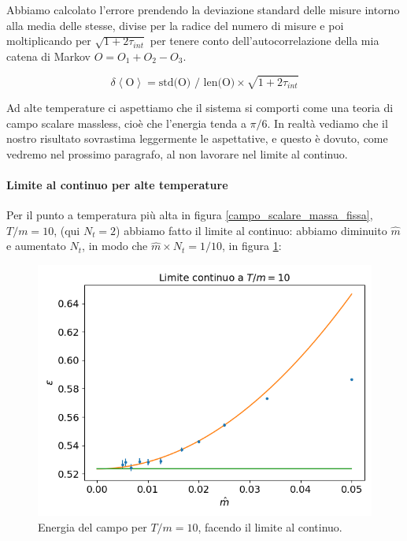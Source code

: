 \documentclass[a4paper, 12pt]{article}
\begin{document}
Abbiamo calcolato l'errore prendendo la deviazione standard delle misure
intorno alla media delle stesse, divise per la radice del numero di misure e
poi moltiplicando per $\sqrt{1+2 \tau_{int}}$ per tenere conto
dell'autocorrelazione della mia catena di Markov $O=O_1+O_2-O_3$.

\begin{equation}
\delta \left< \mbox{O} \right> = \mbox{std(O) / len(O)} \times \sqrt{1+2 \tau_{int}}
\end{equation}

Ad alte temperature ci aspettiamo che il sistema si comporti come una teoria di
campo scalare massless, cioè che l'energia tenda a $\pi / 6$.
In realtà vediamo che il nostro risultato sovrastima leggermente le aspettative,
e questo è dovuto, come vedremo nel prossimo paragrafo, al non lavorare
nel limite al continuo.

\paragraph{Limite al continuo per alte temperature}
Per il punto a temperatura più alta in figura \ref{campo_scalare_massa_fissa},
$T/m=10$, (qui $N_t = 2$) abbiamo fatto il limite al continuo:
abbiamo diminuito $\hat{m}$ e aumentato $N_t$, in modo che $\hat{m} \times N_t = 1 / 10$,
in figura \ref{campo_scalare_temperatura_fissa}:
\begin{figure}
\includegraphics[width=\linewidth]{../figure/massa_variabile.png}
\caption{Energia del campo per $T/m=10$, facendo il limite al continuo.}
\label{campo_scalare_temperatura_fissa}
\end{figure}
\end{document}
